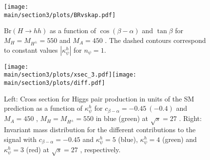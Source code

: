 %
 \begin{figure}
 \begin{center}
 \texttt{[image: \\main/section3/plots/BRvskap.pdf]}
 \caption{\label{fig:BRvskappa} $\text{Br}(H \to hh)$ as a function of $\cos(\beta-\alpha)$ and $ \tan\beta$ for $M_H=M_{H^\pm}=550$ \UGeV and $M_A=450$ \UGeV. The dashed contours correspond to constant values $|\kappa_{\psi}^h|$ for $n_{\psi}=1$.}
 \end{center}
  \vspace{-.6cm}
 \end{figure}
%
%
\begin{figure*}
\texttt{[image: \\main/section3/plots/xsec\_3.pdf]}\texttt{[image: \\main/section3/plots/diff.pdf]}
	\caption{\label{fig:xsecc} Left: Cross section for Higgs pair production in units of the SM prediction as a function of $\kappa_{\psi}^h$ for $c_{\beta-\alpha}=-0.45~(-0.4)$ and $M_A=450$ \UGeV , $M_H=M_{H^\pm}=550$ \UGeV in blue (green) at $\sqrt{s}=27 $ \UTeV. Right: Invariant mass distribution for the different contributions to the signal with $c_{\beta-\alpha}=-0.45$ and $\kappa^h_{\psi}=5$ (blue),  $\kappa_{\psi}^h=4$ (green) and $\kappa_{\psi}^h=3$ (red) at $\sqrt{s}=27 $ \UTeV, respectively.} 
	\label{fig:hhflavourxsanddistr}
\end{figure*}
%

